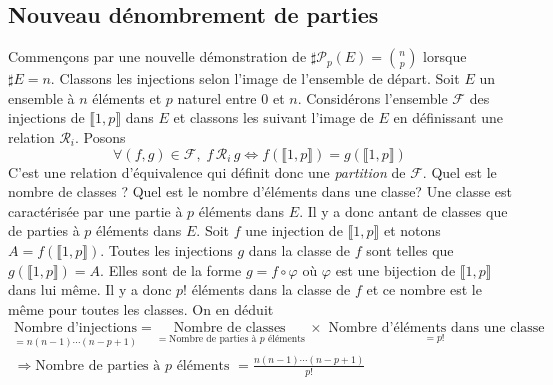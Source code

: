 \begin{demo}
\subsection{Nouveau dénombrement de parties}
Commençons par une nouvelle démonstration de $\sharp \mathcal{P}_p(E) = \binom{n}{p}$ lorsque $\sharp E = n$.\newline
Classons les injections selon l'image de l'ensemble de départ.\newline
Soit $E$ un ensemble à $n$ éléments et $p$ naturel entre $0$ et $n$. Considérons l'ensemble $\mathcal{F}$ des injections de $\llbracket 1,p \rrbracket $ dans $E$ et classons les suivant l'image de $E$ en définissant une relation $\mathcal{R}_i$. Posons
\begin{displaymath}
 \forall(f,g) \in \mathcal{F},\;  f \,\mathcal{R}_i \,g \Leftrightarrow f(\llbracket 1,p \rrbracket) = g(\llbracket 1,p \rrbracket)
\end{displaymath}
C'est une relation d'équivalence qui définit donc une \emph{partition} de $\mathcal{F}$.\newline
Quel est le nombre de classes ? Quel est le nombre d'éléments dans une classe?\newline
Une classe est caractérisée par une partie à $p$ éléments dans $E$. Il y a donc antant de classes que de parties à $p$ éléments dans $E$.\newline
Soit $f$ une injection de $\llbracket 1,p \rrbracket $ et notons  $A=f(\llbracket 1,p \rrbracket)$. Toutes les injections $g$ dans la classe de $f$ sont telles que $g(\llbracket 1,p \rrbracket )=A$. Elles sont de la forme $g=f \circ \varphi$ où $\varphi$ est une bijection de $\llbracket 1,p \rrbracket $ dans lui même. Il y a donc $p!$ éléments dans la classe de $f$ et ce nombre est le même pour toutes les classes.\newline
On en déduit
\begin{multline*}
 \underset{=n(n-1)\cdots(n-p+1)}{\text{Nombre d'injections}} =
 \underset{=\text{Nombre de parties à $p$ éléments }}{\text{Nombre de classes }}
\times 
\underset{=p!}{\text{ Nombre d'éléments dans une classe}}\\
\Rightarrow
\text{Nombre de parties à $p$ éléments } = \frac{n(n-1)\cdots(n-p+1)}{p!}
\end{multline*}
\end{demo}

